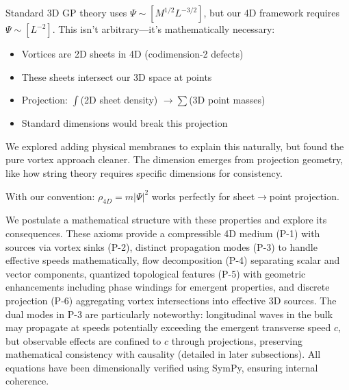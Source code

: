 \begin{tcolorbox}[title={Why $\Psi \sim [L^{-2}]$: A Geometric Necessity}]
Standard 3D GP theory uses $\Psi \sim [M^{1/2} L^{-3/2}]$, but our 4D framework requires $\Psi \sim [L^{-2}]$. This isn't arbitrary---it's mathematically necessary:

\begin{itemize}
\item Vortices are 2D sheets in 4D (codimension-2 defects)
\item These sheets intersect our 3D space at points
\item Projection: $\int$(2D sheet density) $\to \sum$(3D point masses)
\item Standard dimensions would break this projection
\end{itemize}

We explored adding physical membranes to explain this naturally, but found the pure vortex approach cleaner. The dimension emerges from projection geometry, like how string theory requires specific dimensions for consistency.

With our convention: $\rho_{4D} = m |\Psi|^2$ works perfectly for sheet$\to$point projection.
\end{tcolorbox}

We postulate a mathematical structure with these properties and explore its consequences. These axioms provide a compressible 4D medium (P-1) with sources via vortex sinks (P-2), distinct propagation modes (P-3) to handle effective speeds mathematically, flow decomposition (P-4) separating scalar and vector components, quantized topological features (P-5) with geometric enhancements including phase windings for emergent properties, and discrete projection (P-6) aggregating vortex intersections into effective 3D sources. The dual modes in P-3 are particularly noteworthy: longitudinal waves in the bulk may propagate at speeds potentially exceeding the emergent transverse speed $c$, but observable effects are confined to $c$ through projections, preserving mathematical consistency with causality (detailed in later subsections). All equations have been dimensionally verified using SymPy, ensuring internal coherence.

